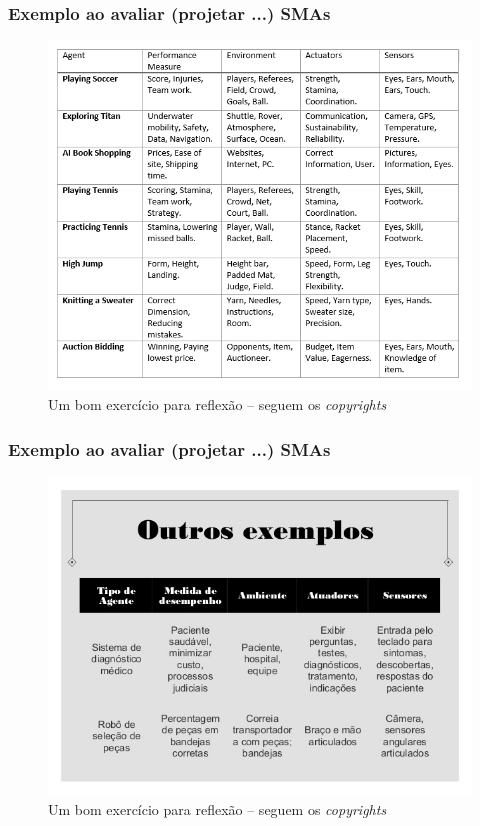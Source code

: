 

\begin{frame} %

 \frametitle{Exemplo ao avaliar (projetar ...) SMAs}

\begin{figure}[!ht]
  \centering
  \includegraphics[height =.7\textheight,width=.8\textwidth]
  {figuras/PEAS01.png}
  \caption{Um bom exercício para reflexão -- seguem os \textit{copyrights}}
\end{figure}

\end{frame}


\begin{frame} %

 \frametitle{Exemplo ao avaliar (projetar ...) SMAs}

\begin{figure}[!ht]
  \centering
  \includegraphics[height =.7\textheight,width=.8\textwidth]
  {figuras/PEAS02.jpg}
  \caption{Um bom exercício para reflexão -- seguem os \textit{copyrights}}
\end{figure}

\end{frame}




